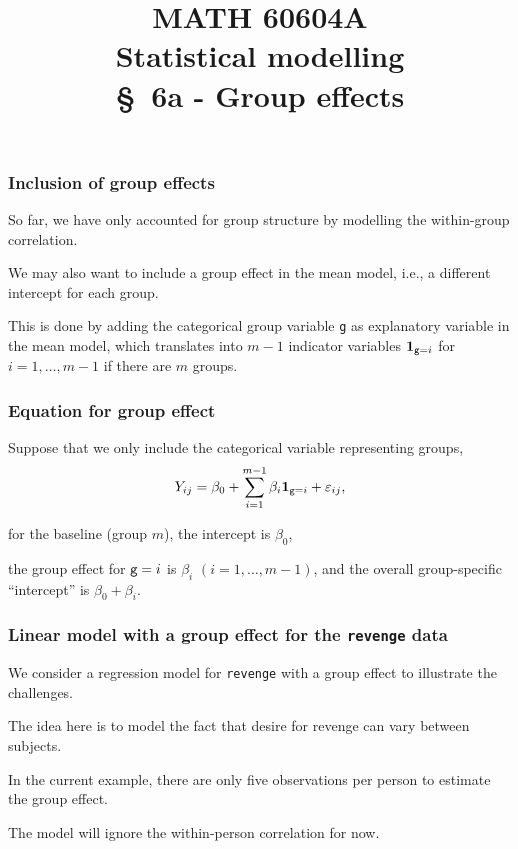 \documentclass{beamer}
\title[\color{white}{MATH 60604A \S~6a - Group effects}]{\texorpdfstring{MATH 60604A \\Statistical modelling \\ \S~6a - Group effects}{MATH 60604A \\Statistical modelling \\ \S~6a - Group effects}}
\author{}
\institute{HEC Montréal\\
Department of Decision Sciences}
\date{}
\begin{document}
\frame{\titlepage}
\begin{frame}
 \frametitle{Inclusion of group effects}
 \bi 
 \item So far, we have only accounted for group structure by modelling the within-group correlation.
 \item We may also want to include a \alert{group effect} in the mean model, i.e., a different intercept for each group.
 \item This is done by adding the categorical group variable \texttt{g} as explanatory variable in the mean model, which translates into $m-1$ indicator variables ${\mathbf 1}_{\texttt{g}=i}$ for $i=1, \ldots, m-1$ if there are $m$ groups. 
 \ei
 \end{frame}
 \begin{frame}
 \frametitle{Equation for group effect}
 \bi
 \item Suppose that we only include the categorical variable  representing groups,
 \[ Y_{ij}= \beta_0 + \sum_{i=1}^{m-1} \beta_i{\mathbf 1}_{\texttt{g}=i} + \varepsilon_{ij},\]
 \bi \item for the baseline (group $m$), the intercept is $\beta_0$,
 \item the group effect for $\texttt{g}=i$ is $\beta_i$ $(i=1, \ldots, m-1)$, and the overall group-specific ``intercept'' is $\beta_0+ \beta_i$.
 \ei
 \ei
 
 \end{frame}
 
\begin{frame}
\frametitle{Linear model with a group effect for the \texttt{revenge} data}
We consider a regression model for \texttt{revenge} with a group effect to illustrate the challenges.
\bi
\item The idea here is to model the fact that desire for revenge can vary between subjects.
\item In the current example, there are only five observations per person to estimate the group effect.
\item The model will ignore the within-person correlation for now.
\ei
\end{frame}
\end{document}
